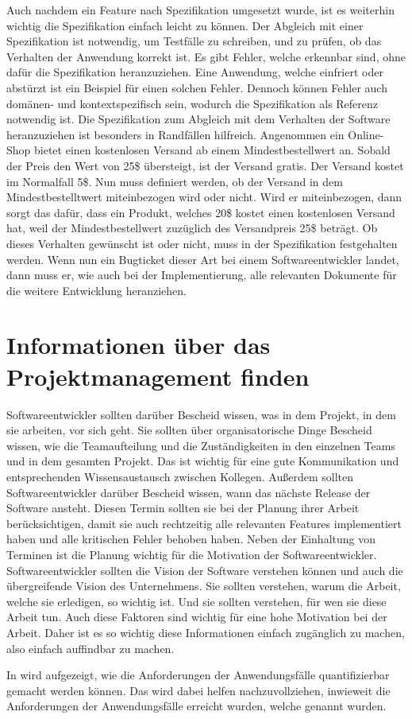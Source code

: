 Auch nachdem ein Feature nach Spezifikation umgesetzt wurde, ist es weiterhin wichtig die Spezifikation einfach leicht zu können.
Der Abgleich mit einer Spezifikation ist notwendig, um Testfälle zu schreiben, und zu prüfen, ob das Verhalten der Anwendung korrekt ist.
Es gibt Fehler, welche erkennbar sind, ohne dafür die Spezifikation heranzuziehen.
Eine Anwendung, welche einfriert oder abstürzt ist ein Beispiel für einen solchen Fehler.
Dennoch können Fehler auch domänen- und kontextspezifisch sein, wodurch die Spezifikation als Referenz notwendig ist.
Die Spezifikation zum Abgleich mit dem Verhalten der Software heranzuziehen ist besonders in Randfällen hilfreich.
Angenommen ein Online-Shop bietet einen kostenlosen Versand ab einem Mindestbestellwert an.
Sobald der Preis den Wert von 25\$ übersteigt, ist der Versand gratis.
Der Versand kostet im Normalfall 5\$.
Nun muss definiert werden, ob der Versand in dem Mindestbestelltwert miteinbezogen wird oder nicht.
Wird er miteinbezogen, dann sorgt das dafür, dass ein Produkt, welches 20\$ kostet einen kostenlosen Versand hat, weil der Mindestbestellwert zuzüglich des Versandpreis 25\$ beträgt.
Ob dieses Verhalten gewünscht ist oder nicht, muss in der Spezifikation festgehalten werden.
Wenn nun ein Bugticket dieser Art bei einem Softwareentwickler landet, dann muss er, wie auch bei der Implementierung, alle relevanten Dokumente für die weitere Entwicklung heranziehen.\\

\section{Informationen über das Projektmanagement finden}
Softwareentwickler sollten darüber Bescheid wissen, was in dem Projekt, in dem sie arbeiten, vor sich geht.
Sie sollten über organisatorische Dinge Bescheid wissen, wie die Teamaufteilung und die Zuständigkeiten in den einzelnen Teams und in dem gesamten Projekt.
Das ist wichtig für eine gute Kommunikation und entsprechenden Wissensaustausch zwischen Kollegen.
Außerdem sollten Softwareentwickler darüber Bescheid wissen, wann das nächste Release der Software ansteht.
Diesen Termin sollten sie bei der Planung ihrer Arbeit berücksichtigen, damit sie auch rechtzeitig alle relevanten Features implementiert haben und alle kritischen Fehler behoben haben.
Neben der Einhaltung von Terminen ist die Planung wichtig für die Motivation der Softwareentwickler.
Softwareentwickler sollten die Vision der Software verstehen können und auch die übergreifende Vision des Unternehmens.
Sie sollten verstehen, warum die Arbeit, welche sie erledigen, so wichtig ist.
Und sie sollten verstehen, für wen sie diese Arbeit tun.
Auch diese Faktoren sind wichtig für eine hohe Motivation bei der Arbeit.
Daher ist es so wichtig diese Informationen einfach zugänglich zu machen, also einfach auffindbar zu machen.

In  wird aufgezeigt, wie die Anforderungen der Anwendungsfälle quantifizierbar gemacht werden können.
Das wird dabei helfen nachzuvollziehen, inwieweit die Anforderungen der Anwendungsfälle erreicht wurden, welche genannt wurden.